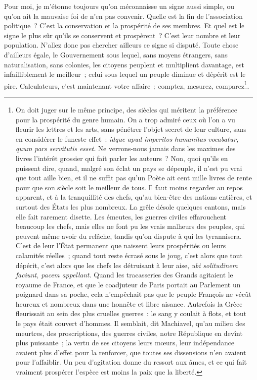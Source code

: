 \documentclass[french,twoside]{book} %
\begin{document}
Pour moi, je m’étonne toujours qu’on méconnaisse un signe aussi simple, ou qu’on ait la mauvaise foi de n’en pas convenir. Quelle est la fin de l’association politique ? C’est la conservation et la prospérité de ses membres. Et quel est le signe le plus sûr qu’ils se conservent et prospèrent ? C’est leur nombre et leur population. N’allez donc pas chercher ailleurs ce signe si disputé. Toute chose d’ailleurs égale, le Gouvernement sous lequel, sans moyens étrangers, sans naturalisation, sans colonies, les citoyens peuplent et multiplient davantage, est infailliblement le meilleur ; celui sous lequel un peuple diminue et dépérit est le pire. Calculateurs, c’est maintenant votre affaire ; comptez, mesurez, comparez\footnote{On doit juger sur le même principe, des siècles qui méritent la préférence pour la prospérité du genre humain. On a trop admiré ceux où l’on a vu fleurir les lettres et les arts, sans pénétrer l’objet secret de leur culture, sans en considérer le funeste effet : {\itshape idque apud imperitos humanitas vocabatur, quum pars servitutis esset.} Ne verrons-nous jamais dans les maximes des livres l’intérêt grossier qui fait parler les auteurs ? Non, quoi qu’ils en puissent dire, quand, malgré son éclat un pays se dépeuple, il n’est pu vrai que tout aille bien, et il ne suffit pas qu’un Poète ait cent mille livres de rente pour que son siècle soit le meilleur de tous. Il faut moins regarder au repos apparent, et à la tranquillité des chefs, qu’au bien-être des nations entières, et surtout des États les plus nombreux. La grêle désole quelques cantons, mais elle fait rarement disette. Les émeutes, les guerres civiles effarouchent beaucoup les chefs, mais elles ne font pu les vrais malheurs des peuples, qui peuvent même avoir du relâche, tandis qu’on dispute à qui les tyrannisera. C’est de leur l’État permanent que naissent leurs prospérités ou leurs calamités réelles ; quand tout reste écrasé sous le joug, c’est alors que tout dépérit, c’est alors que les chefs les détruisant à leur aise, {\itshape ubi solitudinem faciunt, pacem appellant.} Quand les tracasseries des Grands agitaient le royaume de France, et que le coadjuteur de Paris portait au Parlement un poignard dans sa poche, cela n’empêchait pas que le peuple François ne vécût heureux et nombreux dans une honnête et libre aisance. Autrefois la Grèce fleurissait au sein des plus cruelles guerres : le sang y coulait à flots, et tout le pays était couvert d’hommes. Il semblait, dit Machiavel, qu’au milieu des meurtres, des proscriptions, des guerres civiles, notre République en devînt plus puissante ; la vertu de ses citoyens leurs mœurs, leur indépendance avaient plus d’effet pour la renforcer, que toutes ses dissensions n’en avaient pour l’affaiblir. Un peu d’agitation donne du ressort aux âmes, et ce qui fait vraiment prospérer l’espèce est moins la paix que la liberté.}.
\end{document}
